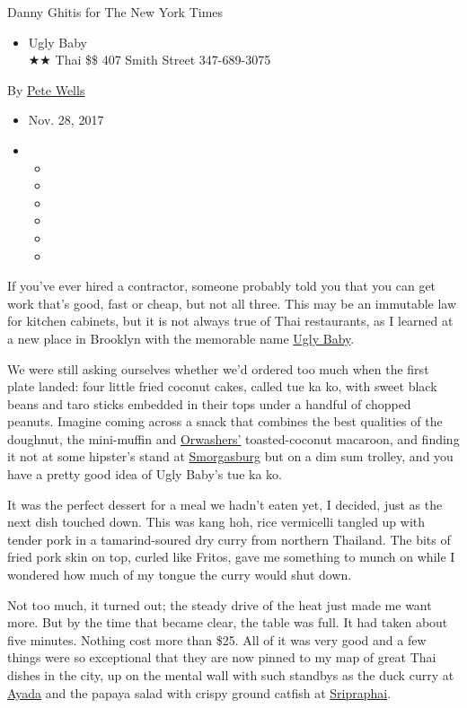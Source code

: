 Danny Ghitis for The New York Times

\begin{itemize}
\tightlist
\item
  Ugly Baby\\
  ★★ Thai \$\$ 407 Smith Street 347-689-3075
\end{itemize}

By \href{http://www.nytimes3xbfgragh.onion/by/pete-wells}{Pete Wells}

\begin{itemize}
\item
  Nov. 28, 2017
\item
  \begin{itemize}
  \item
  \item
  \item
  \item
  \item
  \item
  \end{itemize}
\end{itemize}

If you've ever hired a contractor, someone probably told you that you
can get work that's good, fast or cheap, but not all three. This may be
an immutable law for kitchen cabinets, but it is not always true of Thai
restaurants, as I learned at a new place in Brooklyn with the memorable
name \href{https://www.uglybabynyc.com/}{Ugly Baby}.

We were still asking ourselves whether we'd ordered too much when the
first plate landed: four little fried coconut cakes, called tue ka ko,
with sweet black beans and taro sticks embedded in their tops under a
handful of chopped peanuts. Imagine coming across a snack that combines
the best qualities of the doughnut, the mini-muffin and
\href{https://www.orwashers.com/}{Orwashers'} toasted-coconut macaroon,
and finding it not at some hipster's stand at
\href{https://www.smorgasburg.com/}{Smorgasburg} but on a dim sum
trolley, and you have a pretty good idea of Ugly Baby's tue ka ko.

It was the perfect dessert for a meal we hadn't eaten yet, I decided,
just as the next dish touched down. This was kang hoh, rice vermicelli
tangled up with tender pork in a tamarind-soured dry curry from northern
Thailand. The bits of fried pork skin on top, curled like Fritos, gave
me something to munch on while I wondered how much of my tongue the
curry would shut down.

Not too much, it turned out; the steady drive of the heat just made me
want more. But by the time that became clear, the table was full. It had
taken about five minutes. Nothing cost more than \$25. All of it was
very good and a few things were so exceptional that they are now pinned
to my map of great Thai dishes in the city, up on the mental wall with
such standbys as the duck curry at
\href{http://www.nytimes3xbfgragh.onion/2010/09/08/dining/reviews/08under.html}{Ayada}
and the papaya salad with crispy ground catfish at
\href{http://www.nytimes3xbfgragh.onion/2004/11/03/dining/a-thai-pilgrimage-leads-to-queens.html?_r=0}{Sripraphai}.

